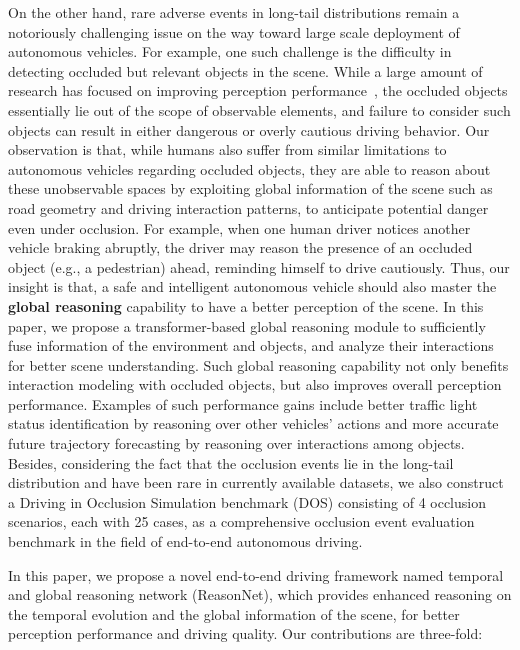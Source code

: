 \documentclass[10pt,twocolumn,letterpaper]{article}
\begin{document}
On the other hand, rare adverse events in long-tail distributions remain a notoriously challenging issue on the way toward large scale deployment of autonomous vehicles. For example, one such challenge is the difficulty in detecting occluded but relevant objects in the scene. While a large amount of research has focused on improving perception performance~\cite{li2022bevformer, vora2020pointpainting}, the occluded objects essentially lie out of the scope of observable elements, and failure to consider such objects can result in either dangerous or overly cautious driving behavior. Our observation is that, while humans also suffer from similar limitations to autonomous vehicles regarding occluded objects, they are able to reason about these unobservable spaces by exploiting global information of the scene such as road geometry and driving interaction patterns, to anticipate potential danger even under occlusion. For example, when one human driver notices another vehicle braking abruptly, the driver may reason the presence of an occluded object (e.g., a pedestrian) ahead, reminding himself to drive cautiously. Thus, our insight is that, a safe and intelligent autonomous vehicle should also master the \textbf{global reasoning} capability to have a better perception of the scene. In this paper, we propose a transformer-based global reasoning module to sufficiently fuse information of the environment and objects, and  analyze  their interactions for better scene understanding. Such global reasoning capability not only benefits interaction modeling with occluded objects, but also improves overall perception performance. Examples of such performance gains include better traffic light status identification by reasoning over other vehicles' actions and more accurate future trajectory forecasting by reasoning over interactions among objects.
Besides, considering the fact that the occlusion events lie in the long-tail distribution and have been rare in currently available datasets, we also construct a Driving in Occlusion Simulation benchmark (DOS) consisting of 4 occlusion scenarios, each with 25 cases, as a comprehensive occlusion event evaluation benchmark in the field of end-to-end autonomous driving.


In this paper, we propose a novel end-to-end driving framework named temporal and global reasoning network (ReasonNet), which provides enhanced reasoning on the temporal evolution and the global information of the scene, for better perception performance and driving quality. Our contributions are three-fold:
\end{document}
